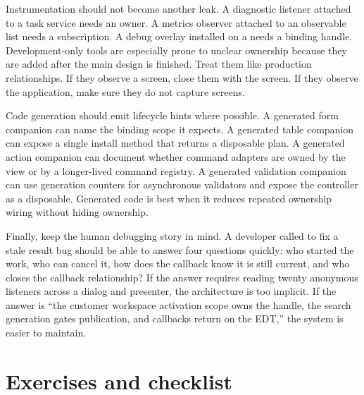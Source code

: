 Instrumentation should not become another leak. A diagnostic listener attached
to a task service needs an owner. A metrics observer attached to an observable
list needs a subscription. A debug overlay installed on a  needs a
binding handle. Development-only tools are especially prone to unclear
ownership because they are added after the main design is finished. Treat them
like production relationships. If they observe a screen, close them with the
screen. If they observe the application, make sure they do not capture screens.

Code generation should emit lifecycle hints where possible. A generated form
companion can name the binding scope it expects. A generated table companion
can expose a single install method that returns a disposable plan. A generated
action companion can document whether command adapters are owned by the view or
by a longer-lived command registry. A generated validation companion can use
generation counters for asynchronous validators and expose the controller as a
disposable. Generated code is best when it reduces repeated ownership wiring
without hiding ownership.

Finally, keep the human debugging story in mind. A developer called to fix a
stale result bug should be able to answer four questions quickly: who started
the work, who can cancel it, how does the callback know it is still current,
and who closes the callback relationship? If the answer requires reading
twenty anonymous listeners across a dialog and presenter, the architecture is
too implicit. If the answer is ``the customer workspace activation scope owns
the handle, the search generation gates publication, and callbacks return on
the EDT,'' the system is easier to maintain.

\section{Exercises and checklist}

